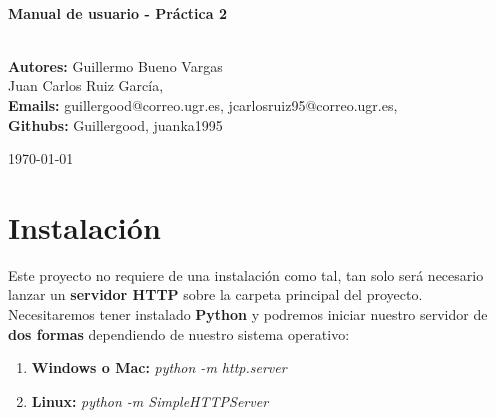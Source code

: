 \documentclass[12zpt]{article}
\begin{document}
\begin{center}
 			\vspace*{1cm}																		%
\HRule \\[0.4cm]																	%
{ \huge \bfseries Manual de usuario - Práctica 2}\\[0.4cm]	%
\HRule \\[1.5cm]																	%
\begin{minipage}{0.46\textwidth}													%
\begin{center} \large															%
\textbf{Autores:} Guillermo Bueno Vargas\\
Juan Carlos Ruiz García,\\
\textbf{Emails:} guillergood@correo.ugr.es, jcarlosruiz95@correo.ugr.es,\\
\textbf{Githubs:} Guillergood, juanka1995\\ 
\end{center}																		%
\end{minipage}		
\vspace{7cm} 																				
\begin{center}																					
{\large \today}																	%
 			\end{center}												  						
\end{center}							 											
																					
\newpage																		


\tableofcontents

\newpage

\section{Instalación}
Este proyecto no requiere de una instalación como tal, tan solo será necesario lanzar un \textbf{servidor HTTP} sobre la carpeta principal del proyecto.
Necesitaremos tener instalado \textbf{Python} y podremos iniciar nuestro servidor de \textbf{dos formas} dependiendo de nuestro sistema operativo:

\begin{enumerate}
	\item \textbf{Windows o Mac:} \textit{python ­-m http.server} 
	\item \textbf{Linux:} \textit{python ­-m SimpleHTTPServer} 
\end{enumerate}
\end{document}
